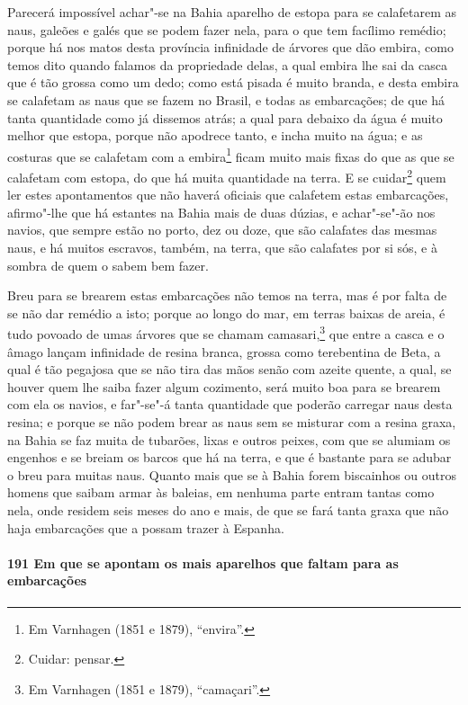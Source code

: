 Parecerá impossível achar"-se na Bahia aparelho de estopa para se calafetarem as naus,
galeões e galés que se podem fazer nela, para o que tem facílimo remédio; porque há nos
matos desta província infinidade de árvores que dão embira, como temos dito quando falamos
da propriedade delas, a qual embira lhe sai da casca que é tão grossa como um dedo; como
está pisada é muito branda, e desta embira se calafetam as naus que se fazem no Brasil, e
todas as embarcações; de que há tanta quantidade como já dissemos atrás; a qual para
debaixo da água é muito melhor que estopa, porque não apodrece tanto, e incha muito na
água; e as costuras que se calafetam com a embira\footnote{ Em Varnhagen (1851 e 1879),
``envira''.} ficam muito mais fixas do que as que se calafetam com estopa, do que há muita
quantidade na terra. E se cuidar\footnote{ Cuidar: pensar.} quem ler estes apontamentos
que não haverá oficiais que calafetem estas embarcações, afirmo"-lhe que há
estantes na Bahia mais de duas dúzias, e achar"-se"-ão nos navios, que sempre estão no
porto, dez ou doze, que são calafates das mesmas naus, e há muitos escravos, também, na
terra, que são calafates por si sós, e à sombra de quem o sabem bem fazer.

Breu para se brearem estas embarcações não temos na terra, mas é por falta de se não dar
remédio a isto; porque ao longo do mar, em terras baixas de areia, é tudo povoado de umas
árvores que se chamam camasari,\footnote{ Em Varnhagen (1851 e 1879), ``camaçari''.} que
entre a casca e o âmago lançam infinidade de resina branca, grossa como terebentina de
Beta, a qual é tão pegajosa que se não tira das mãos senão com azeite quente, a qual, se
houver quem lhe saiba fazer algum cozimento, será muito boa para se brearem com ela os
navios, e far"-se"-á tanta quantidade que poderão carregar naus desta resina; e porque se
não podem brear as naus sem se misturar com a resina graxa, na Bahia se faz muita de
tubarões, lixas e outros peixes, com que se alumiam os engenhos e se breiam os barcos que
há na terra, e que é bastante para se adubar o breu para muitas naus. Quanto mais que se à
Bahia forem biscainhos ou outros homens que saibam armar às baleias, em nenhuma parte
entram tantas como nela, onde residem seis meses do ano e mais, de que se fará tanta graxa
que não haja embarcações que a possam trazer à Espanha.

\paragraph{191 Em que se apontam os mais aparelhos que faltam para as embarcações}

